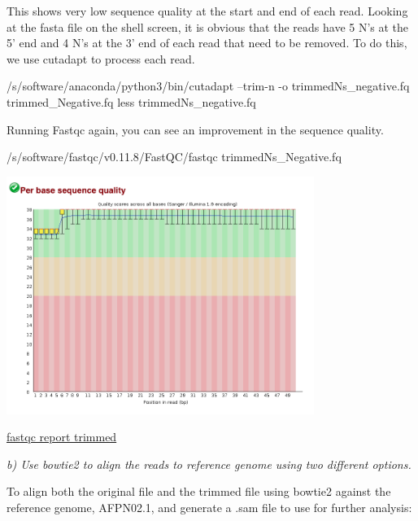 \documentclass[]{article}
\newenvironment{Shaded}{\begin{snugshade}}{\end{snugshade}}
\newcommand{\FunctionTok}[1]{\textcolor[rgb]{0.00,0.00,0.00}{#1}}
\newcommand{\VariableTok}[1]{\textcolor[rgb]{0.00,0.00,0.00}{#1}}
\newcommand{\OperatorTok}[1]{\textcolor[rgb]{0.81,0.36,0.00}{\textbf{#1}}}
\newcommand{\BuiltInTok}[1]{#1}
\newcommand{\ExtensionTok}[1]{#1}
\newcommand{\NormalTok}[1]{#1}
\begin{document}
This shows very low sequence quality at the start and end of each read.
Looking at the fasta file on the shell screen, it is obvious that the
reads have 5 N's at the 5' end and 4 N's at the 3' end of each read that
need to be removed. To do this, we use cutadapt to process each read.

\begin{Shaded}
\begin{Highlighting}[]
\ExtensionTok{/s/software/anaconda/python3/bin/cutadapt}\NormalTok{ --trim-n -o trimmedNs_negative.fq trimmed_Negative.fq}
\FunctionTok{less}\NormalTok{ trimmedNs_negative.fq}
\end{Highlighting}
\end{Shaded}

Running Fastqc again, you can see an improvement in the sequence
quality.

\begin{Shaded}
\begin{Highlighting}[]
\ExtensionTok{/s/software/fastqc/v0.11.8/FastQC/fastqc}\NormalTok{ trimmedNs_Negative.fq}
\end{Highlighting}
\end{Shaded}

\includegraphics[width=0.75000\textwidth]{trimmedNs_negative_fastqc.png}

\href{/d/projects/u/sj003/course_materials/fastq/coursework_1/trimmedNs_Negative_fastqc.html}{fastqc
report trimmed}

\emph{b) Use bowtie2 to align the reads to reference genome using two
different options.}

To align both the original file and the trimmed file using bowtie2
against the reference genome, AFPN02.1, and generate a .sam file to use
for further analysis:

\begin{Shaded}
\end{Shaded}
\end{document}
